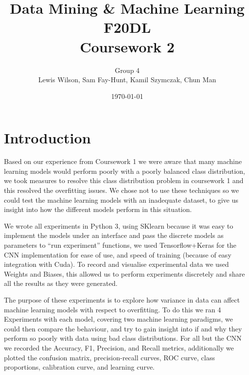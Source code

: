 \documentclass[11pt]{article}
\begin{document}
\title{\huge Data Mining \& Machine Learning F20DL \\ Coursework 2} 
\author{Group 4\\Lewis Wilson, Sam Fay-Hunt, Kamil Szymczak, Chun Man }
\date{\today}
\maketitle

\newpage
\tableofcontents
\thispagestyle{empty}
\pagebreak
\setcounter{page}{1}
\newpage
\section{Introduction}
Based on our experience from Coursework 1 we were aware that many machine learning models would perform poorly with a poorly balanced class distribution, we took measures to resolve this class distribution problem in coursework 1 and this resolved the overfitting issues.
We chose not to use these techniques so we could test the machine learning models with an inadequate dataset, to give us insight into how the different models perform in this situation.

We wrote all experiments in Python 3, using SKlearn because it was easy to implement the models under an interface and pass the discrete models as parameters to “run experiment” functions, we used Tensorflow+Keras for the CNN implementation for ease of use, and speed of training (because of easy integration with Cuda). 
To record and visualise experimental data we used Weights and Biases, this allowed us to perform experiments discretely and share all the results as they were generated.

The purpose of these experiments is to explore how variance in data can affect machine learning models with respect to overfitting. 
To do this we ran 4 Experiments with each model, covering two machine learning paradigms, we could then compare the behaviour, and try to gain insight into if and why they perform so poorly with data using bad class distributions.
For all but the CNN we recorded the Accuracy, F1, Precision, and Recall metrics, additionally we plotted the confusion matrix, precision-recall curves, ROC curve, class proportions, calibration curve, and learning curve.
\end{document}
